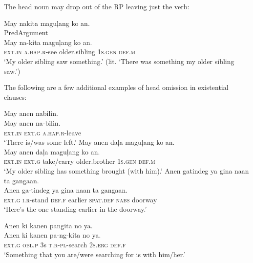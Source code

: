 The head noun may drop out of the RP leaving just the verb:
 
\ea
May  nakita  maguļang  ko  an. \\\smallskip
Pred\hspace{13pt}Argument \\
\gll May  na-kita  maguļang  ko  an. \\
\textsc{ext.in}  \textsc{a.hap.r}-see  older.sibling  1\textsc{s.gen}  \textsc{def.m} \\
\glt ‘My older sibling saw something.’ (lit. ‘There was something my older sibling saw.’)
\z

The following are a few additional examples of head omission in existential clauses:
 
\ea
May  anen  nabilin. \\\smallskip
\gll  May  anen  na-bilin. \\
\textsc{ext.in}  \textsc{ext.g}  \textsc{a.hap.r}-leave \\
\glt ‘There is/was some left.’
\z
\ea
May  anen  daļa  maguļang  ko  an. \\\smallskip
\gll  May  anen  daļa  maguļang  ko  an. \\
\textsc{ext.in}  \textsc{ext.g}  take/carry  older.brother 1\textsc{s.gen}  \textsc{def.m} \\
\glt ‘My older sibling has something brought (with him).’
\z
\ea
Anen  gatindeg  ya  gina  naan  ta  gangaan. \\\smallskip
\gll  Anen  ga-tindeg  ya  gina  naan  ta  gangaan. \\
\textsc{ext.g}  \textsc{i.r}-stand  \textsc{def.f}  earlier  \textsc{spat.def}  \textsc{nabs}  doorway \\
\glt ‘Here’s the one standing earlier in the doorway.’
\z

\newpage
\ea
Anen  ki  kanen  pangita  no  ya. \\\smallskip
\gll  Anen  ki  kanen  pa-ng-kita  no  ya. \\
\textsc{ext.g}  \textsc{obl.p}  3s  \textsc{t.r}-\textsc{pl}-search\footnotemark{}  2\textsc{s.erg}  \textsc{def.f} \\
\glt ‘Something that you are/were searching for is with him/her.’
\z

